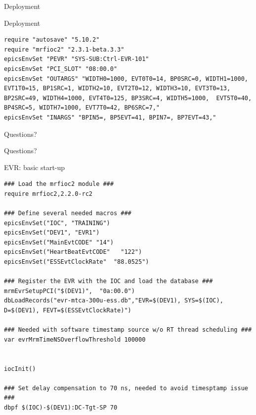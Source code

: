 \documentclass[
  9pt
  , table
  , ignorenonframetext
]{beamer}
\begin{document}
\begin{frame}[fragile]{Deployment}
  \begin{block}{Deployment}
    \begin{lstlisting}[style=termstyle,breaklines=true,basicstyle=\scriptsize]
require "autosave" "5.10.2"
require "mrfioc2" "2.3.1-beta.3.3"
epicsEnvSet "PEVR" "SYS-SUB:Ctrl-EVR-101"
epicsEnvSet "PCI_SLOT" "08:00.0"
epicsEnvSet "OUTARGS" "WIDTH0=1000, EVT0T0=14, BP0SRC=0, WIDTH1=1000, EVT1T0=15, BP1SRC=1, WIDTH2=10, EVT2T0=12, WIDTH3=10, EVT3T0=13, BP2SRC=49, WIDTH4=1000, EVT4T0=125, BP3SRC=4, WIDTH5=1000,  EVT5T0=40, BP4SRC=5, WIDTH7=1000, EVT7T0=42, BP6SRC=7,"
epicsEnvSet "INARGS" "BPIN5=, BP5EVT=41, BPIN7=, BP7EVT=43,"

    \end{lstlisting}
  \end{block}
\end{frame}

\begin{frame}{Questions?}
  \begin{center}
    {\Huge Questions?}
  \end{center}
\end{frame}

\begin{frame}[fragile]{EVR: basic start-up}
\begin{lstlisting}[style=termstyle,breaklines=true,basicstyle=\scriptsize]
### Load the mrfioc2 module ###
require mrfioc2,2.2.0-rc2

### Define several needed macros ###
epicsEnvSet("IOC", "TRAINING")
epicsEnvSet("DEV1", "EVR1")
epicsEnvSet("MainEvtCODE" "14")
epicsEnvSet("HeartBeatEvtCODE"   "122")
epicsEnvSet("ESSEvtClockRate"  "88.0525")

### Register the EVR with the IOC and load the database ###
mrmEvrSetupPCI("$(DEV1)",  "0a:00.0")
dbLoadRecords("evr-mtca-300u-ess.db","EVR=$(DEV1), SYS=$(IOC), D=$(DEV1), FEVT=$(ESSEvtClockRate)")

### Needed with software timestamp source w/o RT thread scheduling ###
var evrMrmTimeNSOverflowThreshold 100000


iocInit()

### Set delay compensation to 70 ns, needed to avoid timesptamp issue ###
dbpf $(IOC)-$(DEV1):DC-Tgt-SP 70

\end{lstlisting}
\end{frame}
\end{document}
